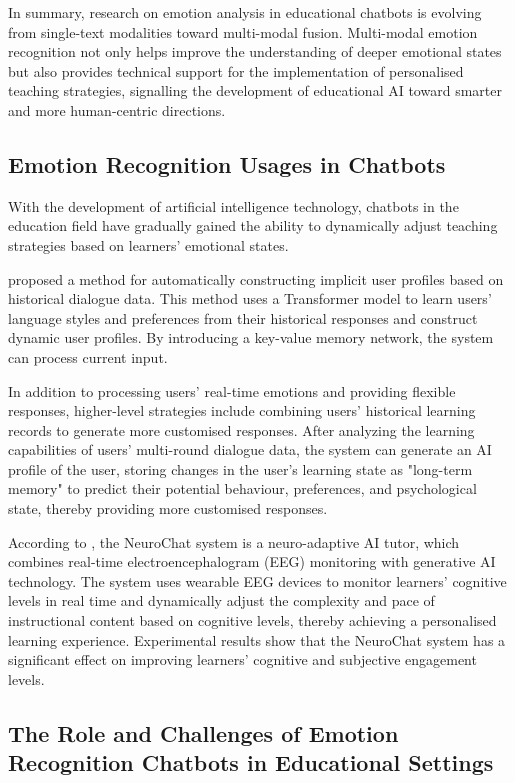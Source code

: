 \documentclass{xum_review}
\begin{document}
In summary, research on emotion analysis in educational chatbots is evolving
from single-text modalities toward multi-modal fusion. Multi-modal emotion
recognition not only helps improve the understanding of deeper emotional states
but also provides technical support for the implementation of personalised
teaching strategies, signalling the development of educational AI toward smarter
and more human-centric directions.  

\subsection{Emotion Recognition Usages in Chatbots}

With the development of artificial intelligence technology, chatbots in the
education field have gradually gained the ability to dynamically adjust teaching
strategies based on learners' emotional states.

\citet{ma2021one} proposed a method for automatically constructing
implicit user profiles based on historical dialogue data. This method uses a
Transformer model to learn users' language styles and preferences from their
historical responses and construct dynamic user profiles. By introducing a
key-value memory network, the system can process current input. 

In addition to processing users' real-time emotions and providing flexible
responses, higher-level strategies include combining users' historical learning
records to generate more customised responses. After analyzing the learning
capabilities of users' multi-round dialogue data, the system can generate an AI
profile of the user, storing changes in the user's learning state as "long-term
memory" to predict their potential behaviour, preferences, and psychological
state, thereby providing more customised responses.

According to \citet{baradari2025neurochatneuroadaptiveaichatbot}, the NeuroChat system is a
neuro-adaptive AI tutor, which combines real-time electroencephalogram (EEG)
monitoring with generative AI technology. The system uses wearable EEG devices
to monitor learners' cognitive levels in real time and dynamically adjust the
complexity and pace of instructional content based on cognitive levels, thereby
achieving a personalised learning experience. Experimental results show that the
NeuroChat system has a significant effect on improving learners' cognitive and
subjective engagement levels. 

\subsection{The Role and Challenges of Emotion Recognition Chatbots in Educational Settings}
\end{document}
